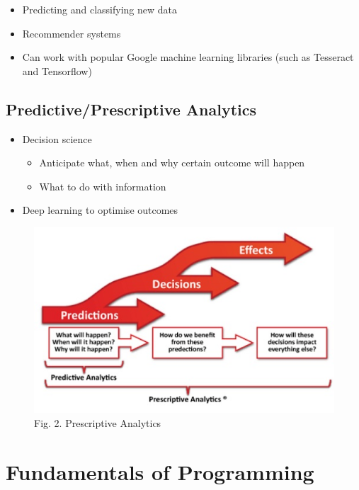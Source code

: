 \documentclass[11pt]{article}
\makeatletter
\def\maxwidth{\ifdim\Gin@nat@width>\linewidth\linewidth
    \else\Gin@nat@width\fi}
\let\Oldincludegraphics\includegraphics
\renewcommand{\includegraphics}[1]{\Oldincludegraphics[width=.8\maxwidth]{#1}}
\providecommand{\tightlist}{%
      \setlength{\itemsep}{0pt}\setlength{\parskip}{0pt}}
\makeatother
\begin{document}
\begin{itemize}
\tightlist
\item
  Predicting and classifying new data
\item
  Recommender systems
\item
  Can work with popular Google machine learning libraries (such as
  Tesseract and Tensorflow)
\end{itemize}

    \hypertarget{predictiveprescriptive-analytics}{%
\subsection{Predictive/Prescriptive
Analytics}\label{predictiveprescriptive-analytics}}

\begin{itemize}
\tightlist
\item
  Decision science

  \begin{itemize}
  \tightlist
  \item
    Anticipate what, when and why certain outcome will happen
  \item
    What to do with information
  \end{itemize}
\item
  Deep learning to optimise outcomes
\end{itemize}

    \begin{figure}[H]
\centering
\includegraphics{figs/prescriptive.jpg}
\caption{Fig. 2. Prescriptive Analytics}
\end{figure}

    \hypertarget{fundamentals-of-programming}{%
\section{Fundamentals of
Programming}\label{fundamentals-of-programming}}
\end{document}
